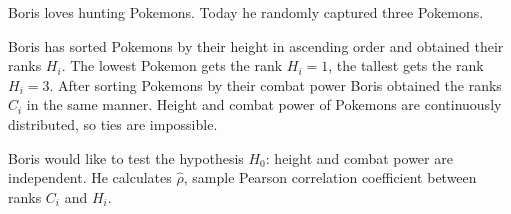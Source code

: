 \documentclass[addpoints, answers]{exam} %
\begin{document}
\begin{questions}



\question Boris loves hunting Pokemons. Today he randomly captured three Pokemons.

Boris has sorted Pokemons by their height in ascending order and obtained their ranks $H_i$. The lowest Pokemon gets the rank $H_i = 1$, the tallest gets the rank $H_i = 3$. After sorting Pokemons by their combat power Boris obtained the ranks $C_i$ in the same manner. Height and combat power of Pokemons are continuously distributed, so ties are impossible.

Boris would like to test the hypothesis $H_0$: height and combat power are independent. He calculates $\hat \rho$, sample Pearson correlation coefficient between ranks $C_i$ and $H_i$.

\end{questions}
\end{document}

